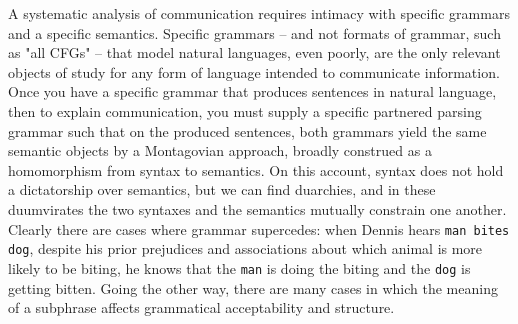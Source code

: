 A systematic analysis of communication requires intimacy with specific grammars and a specific semantics. Specific grammars -- and not formats of grammar, such as "all CFGs" -- that model natural languages, even poorly, are the only relevant objects of study for any form of language intended to communicate information. Once you have a specific grammar that produces sentences in natural language, then to explain communication, you must supply a specific partnered parsing grammar such that on the produced sentences, both grammars yield the same semantic objects by a Montagovian approach, broadly construed as a homomorphism from syntax to semantics. On this account, syntax does not hold a dictatorship over semantics, but we can find duarchies, and in these duumvirates the two syntaxes and the semantics mutually constrain one another.\\

 Clearly there are cases where grammar supercedes: when Dennis hears \texttt{man bites dog}, despite his prior prejudices and associations about which animal is more likely to be biting, he knows that the \texttt{man} is doing the biting and the \texttt{dog} is getting bitten. Going the other way, there are many cases in which the meaning of a subphrase affects grammatical acceptability and structure.

